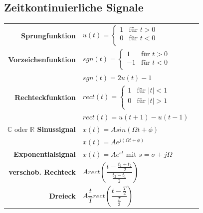 \documentclass[10pt,a4paper]{article}
\begin{document}
\subsection*{Zeitkontinuierliche Signale}
\begin{tabular}{r>{\centering\arraybackslash}p{6cm}l}
	\textbf{Sprungfunktion} & $u(t)=\begin{cases}
	1 & \text{für } t>0\\
	0 & \text{für } t<0\\
	\end{cases}$ & \\
	\textbf{Vorzeichenfunktion} & $sgn(t)=\begin{cases}
	1 & \text{für } t>0\\
	-1 & \text{für } t<0\\
	\end{cases}$ & \\ 
	& $sgn(t) = 2u(t)-1$ & \\
	\textbf{Rechteckfunktion} & $rect(t)=\begin{cases}
	1 & \text{für } \vert t\vert<1\\
	0 & \text{für } \vert t\vert>1\\
	\end{cases}$ & \\
	& $rect(t)= u(t+1)-u(t-1)$& \\
	\textbf{$\mathbb C \text{ oder } \mathbb R$ Sinussignal} & $x(t)=Asin(\Omega t+ \phi)$& \\
	& $x(t)=Ae^{j(\Omega t + \phi)}$ & \\
	\textbf{Exponentialsignal} & $x(t)=Ae^{st}$ mit $s=\sigma + j\Omega$&\\
	\textbf{verschob. Rechteck}&$Arect(\dfrac{t-\frac{t_1+t_2}{2}}{\frac{t_2-t_1}{2}})$&\\
	\textbf{Dreieck}&$A\dfrac{t}{T}rect(\dfrac{t-\frac{T}{2}}{\frac{T}{2}})$&\\
\end{tabular} 
\end{document}
